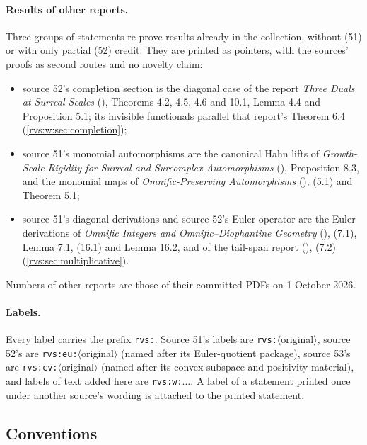 \documentclass[11pt,letterpaper]{article}
\numberwithin{equation}{section}
\theoremstyle{definition}
\theoremstyle{remark}
\begin{document}
\paragraph{Results of other reports.}  Three groups of statements re-prove
results already in the collection, without (51) or with only partial (52)
credit.  They are printed as pointers, with the sources' proofs as second
routes and no novelty claim:
\begin{itemize}
\item source 52's completion section is the diagonal case of the report
\emph{Three Duals at Surreal Scales}
(), Theorems 4.2,
4.5, 4.6 and 10.1, Lemma 4.4 and Proposition 5.1; its invisible
functionals parallel that report's Theorem 6.4 (\cref{rvs:w:sec:completion});
\item source 51's monomial automorphisms are the canonical Hahn lifts of
\emph{Growth-Scale Rigidity for Surreal and Surcomplex Automorphisms}
(), Proposition 8.3, and
the monomial maps of \emph{Omnific-Preserving Automorphisms}
(), (5.1) and Theorem 5.1;
\item source 51's diagonal derivations and source 52's Euler operator are
the Euler derivations of \emph{Omnific Integers and Omnific--Diophantine
Geometry} (), (7.1), Lemma 7.1,
(16.1) and Lemma 16.2, and of the tail-span report
(), (7.2)
(\cref{rvs:sec:multiplicative}).
\end{itemize}
Numbers of other reports are those of their committed PDFs on 1 October 2026.

\paragraph{Labels.}  Every label carries the prefix \texttt{rvs:}.  Source
51's labels are \texttt{rvs:}\(\langle\)original\(\rangle\), source 52's are
\texttt{rvs:eu:}\(\langle\)original\(\rangle\) (named after its Euler-quotient
package), source 53's are \texttt{rvs:cv:}\(\langle\)original\(\rangle\) (named
after its convex-subspace and positivity material), and labels of text added
here are \texttt{rvs:w:}\(\ldots\).  A label of a statement printed once
under another source's wording is attached to the printed statement.

\subsection{Conventions}\label{rvs:w:sec:conventions}
\end{document}
